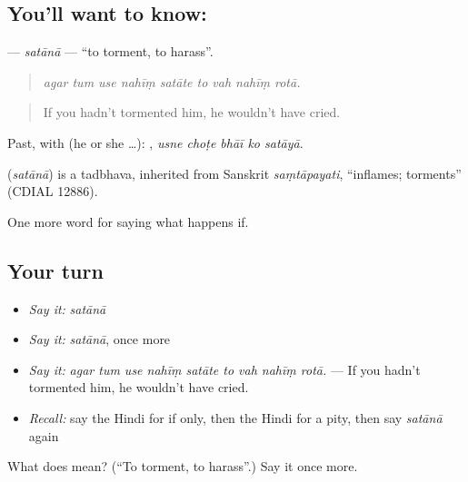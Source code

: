 \subsection*{You'll want to know: }
\textbf{} — \emph{satānā} — \textquotedblleft{}to torment, to harass\textquotedblright{}.

\begin{quote}
        
\end{quote}

\begin{quote}
\emph{agar tum use nahīṃ satāte to vah nahīṃ rotā.}
\end{quote}

\begin{quote}
If you hadn't tormented him, he wouldn't have cried.
\end{quote}

Past, with  (he or she …):     , \emph{usne choṭe bhāī ko satāyā}.

\begin{cousinweb}
\textbf{} (\emph{satānā}) is a tadbhava, inherited from Sanskrit \emph{saṃtāpayati}, \textquotedblleft{}inflames; torments\textquotedblright{} (CDIAL 12886).
\end{cousinweb}

\begin{grammarlens}[title={What you've built}]
One more word for saying what happens if.
\end{grammarlens}

\subsection*{Your turn}
\begin{itemize}
\raggedright
  \item \emph{Say it:} \emph{satānā}
  \item \emph{Say it:} \emph{satānā}, once more
  \item \emph{Say it:} \emph{agar tum use nahīṃ satāte to vah nahīṃ rotā.} — If you hadn't tormented him, he wouldn't have cried.
  \item \emph{Recall:} say the Hindi for if only, then the Hindi for a pity, then say \emph{satānā} again
\end{itemize}

\begin{tcolorbox}[breakable,colback=teal!4,colframe=teal!35!black,title={Before you move on}]
What does  mean? (\textquotedblleft{}To torment, to harass\textquotedblright{}.) Say it once more.
\end{tcolorbox}
